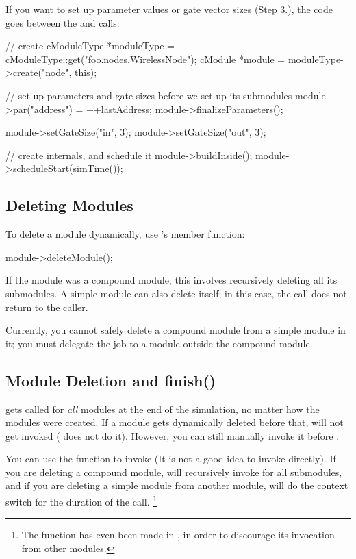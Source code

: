 If you want to set up parameter values or gate vector sizes (Step 3.),
the code goes between the  and
 calls:

\begin{cpp}
// create
cModuleType *moduleType = cModuleType::get("foo.nodes.WirelessNode");
cModule *module = moduleType->create("node", this);

// set up parameters and gate sizes before we set up its submodules
module->par("address") = ++lastAddress;
module->finalizeParameters();

module->setGateSize("in", 3);
module->setGateSize("out", 3);

// create internals, and schedule it
module->buildInside();
module->scheduleStart(simTime());
\end{cpp}


\subsection{Deleting Modules}

To delete a module dynamically, use
's  member function:

\begin{cpp}
module->deleteModule();
\end{cpp}

If the module was a compound module, this involves recursively
deleting all its submodules. A simple module can also delete itself;
in this case, the  call does not return to the
caller.

Currently, you cannot safely delete a compound module from a simple module
in it; you must delegate the job to a module outside the compound
module.


\subsection{Module Deletion and finish()}

 gets called for \textit{all} modules at the end of the
simulation, no matter how the modules were created. If a module gets
dynamically deleted before that,  will not get invoked
( does not do it). However, you can still manually
invoke it before .

You can use the  function to invoke 
(It is not a good idea to invoke  directly). If you are
deleting a compound module,  will recursively invoke
 for all submodules, and if you are deleting a simple
module from another module,  will do the context switch
for the duration of the call.
  \footnote{The  function has even been made 
  in , in order to discourage its invocation from
  other modules.}

